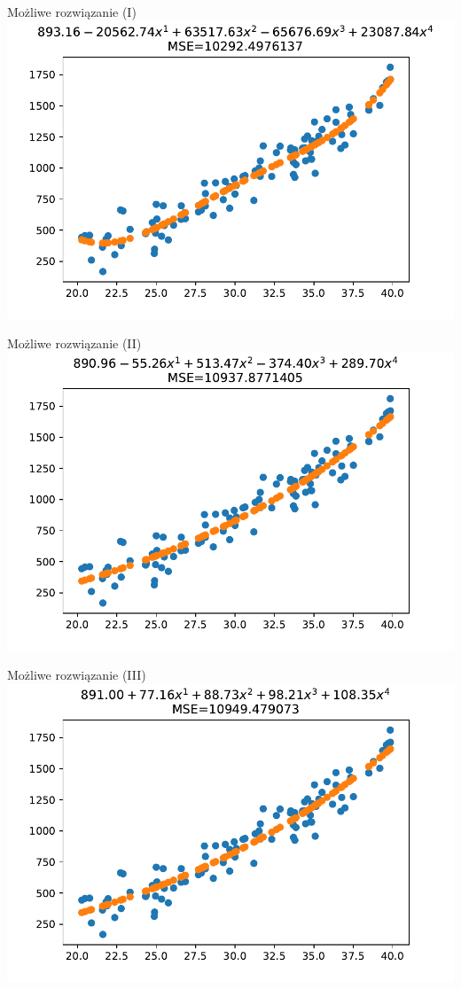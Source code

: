 \documentclass{sa}
\begin{document}
\begin{frame}{Możliwe rozwiązanie (I)}
\includegraphics[width=\textwidth]{reg-2deg-with-noise-ridge0.pdf}
\end{frame}

\begin{frame}{Możliwe rozwiązanie (II)}
\includegraphics[width=\textwidth]{reg-2deg-with-noise-ridge0_001.pdf}
\end{frame}

\begin{frame}{Możliwe rozwiązanie (III)}
\includegraphics[width=\textwidth]{reg-2deg-with-noise-ridge1.pdf}
\end{frame}
\end{document}
